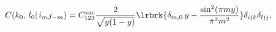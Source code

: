 \begin{equation} \label{twoi2}
C(k_0,\,l_0 |\, i_m j_{-m}) 
 = C_{123}^{\rm vac}
\frac{2}{\sqrt{y(1-y)}}\lrbrk{\delta_{m,0}\, y
-\frac{\sin^2(\pi m y)}{\pi^2 m^2}} \delta_{i(k}\delta_{l)j},
\end{equation}

